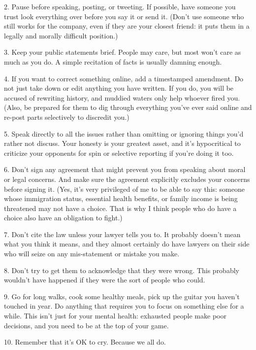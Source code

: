 \documentclass[10pt,letterpaper]{article}
\begin{document}
2. Pause before speaking, posting, or tweeting.
   If possible, have someone you trust look everything over before you say it or
   send it.  (Don't use someone who still works for the company, even if they are
   your closest friend: it puts them in a legally and morally difficult position.)

3. Keep your public statements brief.
   People may care, but most won't care as much as you do.  A simple recitation of
   facts is usually damning enough.

4. If you want to correct something online, add a timestamped amendment.
   Do not just take down or edit anything you have written.  If you do, you will be
   accused of rewriting history, and muddied waters only help whoever fired you.
   (Also, be prepared for them to dig through everything you've ever said online
   and re-post parts selectively to discredit you.)

5. Speak directly to all the issues rather than omitting or ignoring things you'd rather not discuss.
   Your honesty is your greatest asset, and it's hypocritical to criticize your
   opponents for spin or selective reporting if you're doing it too.

6. Don't sign any agreement that might prevent you from speaking about moral or legal concerns.
   And make sure the agreement explicitly excludes your concerns before signing it.
   (Yes, it's very privileged of me to be able to say this: someone whose
   immigration status, essential health benefits, or family income is being
   threatened may not have a choice.  That is why I think people who do have a
   choice also have an obligation to fight.)

7. Don't cite the law unless your lawyer tells you to.
   It probably doesn't mean what you think it means, and they almost certainly do
   have lawyers on their side who will seize on any mis-statement or mistake you
   make.

8. Don't try to get them to acknowledge that they were wrong.
   This probably wouldn't have happened if they were the sort of people who could.

9. Go for long walks, cook some healthy meals, pick up the guitar you haven't touched in year.
   Do anything that requires you to focus on something else for a while.  This
   isn't just for your mental health: exhausted people make poor decisions, and you
   need to be at the top of your game.

10. Remember that it's OK to cry.
    Because we all do.
\end{document}
